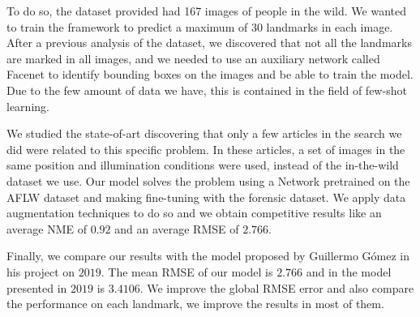 \medskip

\noindent To do so, the dataset provided had 167 images of people in the wild. We wanted to train the framework to predict a maximum of $30$ landmarks in each image. After a previous analysis of the dataset, we discovered that not all the landmarks are marked in all images, and we needed to use an auxiliary network called Facenet to identify bounding boxes on the images and be able to train the model. Due to the few amount of data we have, this is contained in the field of few-shot learning. 

\medskip

\noindent We studied the state-of-art discovering that only a few articles in the search we did were related to this specific problem. In these articles, a set of images in the same position and illumination conditions were used, instead of the in-the-wild dataset we use. Our model solves the problem using a Network pretrained on the AFLW dataset and making fine-tuning with the forensic dataset. We apply data augmentation techniques to do so and we obtain competitive results like an average NME of $0.92$ and an average RMSE of $2.766$. 

\medskip

\noindent Finally, we compare our results with the model proposed by Guillermo Gómez in his project on $2019$. The mean RMSE of our model is $2.766$ and in the model presented in $2019$ is $3.4106$. We improve the global RMSE error and also compare the performance on each landmark, we improve the results in most of them.

\endinput
